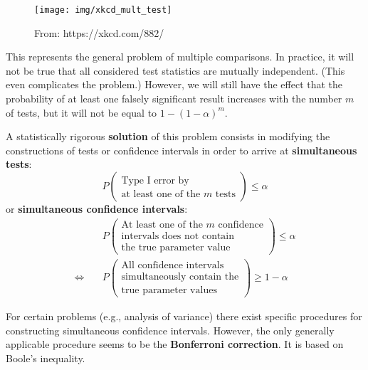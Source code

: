 \documentclass[
]{book}
\begin{document}
\hfill\break

\begin{figure}

{\centering \texttt{[image: img/xkcd\_mult\_test]} 

}

\caption{From: https://xkcd.com/882/}\label{fig:unnamed-chunk-5}
\end{figure}

This represents the general problem of multiple comparisons. In practice, it will not be true that all considered test statistics are mutually independent. (This even complicates the problem.) However, we will still have the effect that the probability of at least one falsely significant result increases with the number \(m\) of tests, but it will not be equal to \(1-(1-\alpha)^m\).

\hfill\break

A statistically rigorous \textbf{solution} of this problem consists in modifying the constructions of tests or confidence intervals in order to arrive at \textbf{simultaneous tests}:
\[
P\begin{pmatrix}
    \text{Type I error by} \\
    \text{at least one of the $m$ tests}
 \end{pmatrix} \leq \alpha
\]
or \textbf{simultaneous confidence intervals}:
\begin{align*}
&P \begin{pmatrix}
      \text{At least one of the $m$ confidence} \\
      \text{intervals does not contain} \\
      \text{the true parameter value}
  \end{pmatrix}  \leq \alpha\\[2ex]
\Leftrightarrow\quad 
&P \begin{pmatrix}
    \text{All confidence intervals} \\
    \text{simultaneously contain the} \\
    \text{true parameter values}
  \end{pmatrix} \geq 1 - \alpha
\end{align*}

\hfill\break

For certain problems (e.g., analysis of variance) there exist specific procedures for constructing
simultaneous confidence intervals. However, the only generally applicable procedure seems to be the
\textbf{Bonferroni correction}. It is based on Boole's inequality.
\end{document}
